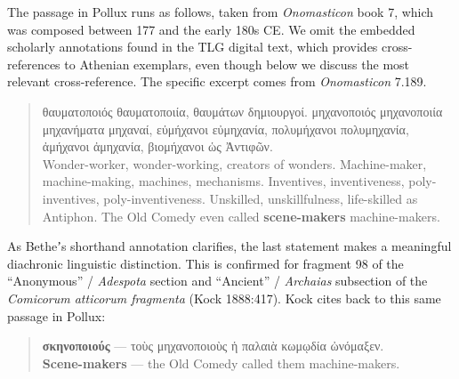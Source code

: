 The passage in Pollux runs as follows, taken from \textit{Onomasticon} book 7, %
which was composed between 177 and the early 180s CE. %
We omit the embedded scholarly annotations found in the TLG digital text, %
which provides cross-references to Athenian exemplars, %
even though below we discuss the most relevant cross-reference. %
The specific excerpt comes from \textit{Onomasticon} 7.189. %

\vspace*{2mm} 
 \begin{quote}θαυματοποιός θαυματοποιία, θαυμάτων δημιουργοί. \newline
 μηχανοποιός μηχανοποιία μηχανήματα μηχαναί, \newline
 εὐμήχανοι εὐμηχανία, πολυμήχανοι πολυμηχανία, \newline
 ἀμήχανοι ἀμηχανία, βιομήχανοι ὡς Ἀντιφῶν. \newline
 \\[1mm] %
 Wonder-worker, wonder-working, creators of wonders. \newline
 Machine-maker, machine-making, machines, mechanisms. \newline
 Inventives, inventiveness, poly-inventives, poly-inventiveness. \newline
 Unskilled, unskillfulness, life-skilled as Antiphon. \newline
 The Old Comedy even called \textbf{scene-makers} machine-makers.\end{quote} %
 \vspace*{2mm}

As Betheʼs shorthand annotation clarifies, %
the last statement makes a meaningful diachronic linguistic distinction. %
This is confirmed for fragment 98 of the “Anonymous” / \textit{Adespota} section and “Ancient” / \textit{Archaias} subsection %
of the \textit{Comicorum atticorum fragmenta} (Kock 1888:417). %
Kock cites back to this same passage in Pollux: %

\vspace*{2mm} 
 \begin{quote}\textbf{σκηνοποιούς} — τοὺς μηχανοποιοὺς ἡ παλαιὰ κωμῳδία ὠνόμαξεν. \\[1mm] %
 \textbf{Scene-makers} — the Old Comedy called them machine-makers. \end{quote} %
\vspace*{2mm} 

